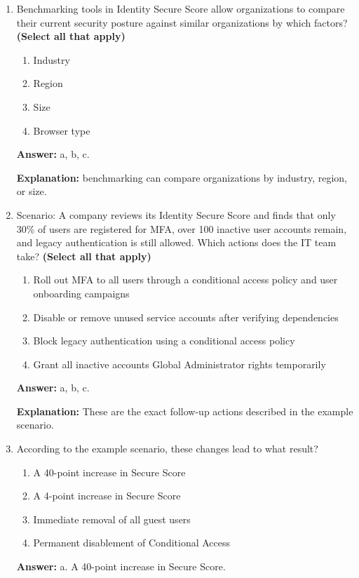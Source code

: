 \documentclass[10pt]{article}
\begin{document}
\begin{enumerate}[leftmargin=*]
\textbf{Explanation:} These four status options are explicitly listed in the documentation.

\item Benchmarking tools in Identity Secure Score allow organizations to compare their current security posture against similar organizations by which factors? \textbf{(Select all that apply)}
\begin{enumerate}[label=\alph*., leftmargin=1.5em]
\item Industry
\item Region
\item Size
\item Browser type
\end{enumerate}
\textbf{Answer:} a, b, c.

\textbf{Explanation:} benchmarking can compare organizations by industry, region, or size.

\item Scenario: A company reviews its Identity Secure Score and finds that only 30\% of users are registered for MFA, over 100 inactive user accounts remain, and legacy authentication is still allowed. Which actions does the IT team take? \textbf{(Select all that apply)}
\begin{enumerate}[label=\alph*., leftmargin=1.5em]
\item Roll out MFA to all users through a conditional access policy and user onboarding campaigns
\item Disable or remove unused service accounts after verifying dependencies
\item Block legacy authentication using a conditional access policy
\item Grant all inactive accounts Global Administrator rights temporarily
\end{enumerate}
\textbf{Answer:} a, b, c.

\textbf{Explanation:} These are the exact follow-up actions described in the example scenario.

\item According to the example scenario, these changes lead to what result?
\begin{enumerate}[label=\alph*., leftmargin=1.5em]
\item A 40-point increase in Secure Score
\item A 4-point increase in Secure Score
\item Immediate removal of all guest users
\item Permanent disablement of Conditional Access
\end{enumerate}
\textbf{Answer:} a. A 40-point increase in Secure Score.


\end{enumerate}
\end{document}
